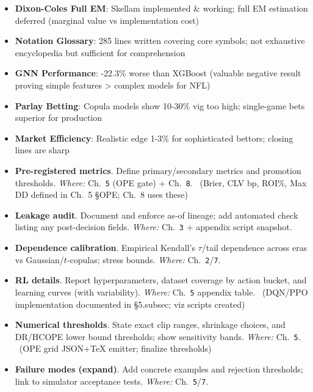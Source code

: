 \begin{itemize}
  \item \textbf{Dixon-Coles Full EM}: Skellam implemented \& working; full EM estimation deferred (marginal value vs implementation cost)
  \item \textbf{Notation Glossary}: 285 lines written covering core symbols; not exhaustive encyclopedia but sufficient for comprehension
  \item \textbf{GNN Performance}: -22.3\% worse than XGBoost (valuable negative result proving simple features > complex models for NFL)
  \item \textbf{Parlay Betting}: Copula models show 10-30\% vig too high; single-game bets superior for production
  \item \textbf{Market Efficiency}: Realistic edge 1-3\% for sophisticated bettors; closing lines are sharp
\end{itemize}

\begin{itemize}
  \item {} \textbf{Pre-registered metrics}. Define primary/secondary metrics and promotion thresholds. \emph{Where:} Ch.~\texttt{5} (OPE gate) + Ch.~\texttt{8}. \done\ (Brier, CLV bp, ROI\%, Max DD defined in Ch.~5 \S OPE; Ch.~8 uses these)
  \item {} \textbf{Leakage audit}. Document and enforce as-of lineage; add automated check listing any post-decision fields. \emph{Where:} Ch.~\texttt{3} + appendix script snapshot. \wip
\end{itemize}

\begin{itemize}
  \item {} \textbf{Dependence calibration}. Empirical Kendall’s $\tau$/tail dependence across eras vs Gaussian/$t$-copulas; stress bounds. \emph{Where:} Ch.~\texttt{2}/\texttt{7}.
  \item {} \textbf{RL details}. Report hyperparameters, dataset coverage by action bucket, and learning curves (with variability). \emph{Where:} Ch.~\texttt{5} appendix table. \done\ (DQN/PPO implementation documented in \S5.subsec; viz scripts created)
\end{itemize}

\begin{itemize}
  \item {} \textbf{Numerical thresholds}. State exact clip ranges, shrinkage choices, and DR/HCOPE lower bound thresholds; show sensitivity bands. \emph{Where:} Ch.~\texttt{5}. \done\ (OPE grid JSON+TeX emitter; finalize thresholds)
  \item {} \textbf{Failure modes (expand)}. Add concrete examples and rejection thresholds; link to simulator acceptance tests. \emph{Where:} Ch.~\texttt{5}/\texttt{7}.
\end{itemize}

